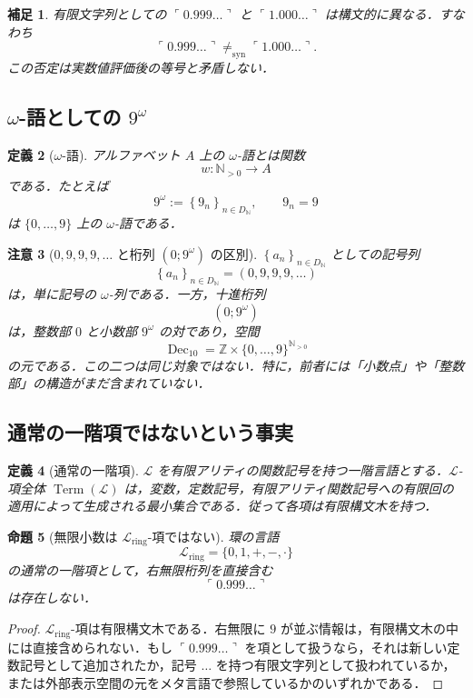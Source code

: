 \documentclass[a4paper,11pt]{ltjsarticle}
\theoremstyle{jpdef}
\newtheorem{definition}{定義}[section]
\newtheorem{remark}[definition]{補足}
\newtheorem{warning}[definition]{注意}
\theoremstyle{jpthm}
\newtheorem{proposition}[definition]{命題}
\newcommand{\N}{\mathbb{N}}
\newcommand{\Z}{\mathbb{Z}}
\newcommand{\Lang}{\mathcal L}
\newcommand{\Term}{\operatorname{Term}}
\newcommand{\Syn}{=_{\mathrm{syn}}}
\newcommand{\Dec}{\operatorname{Dec}_{10}}
\newcommand{\Ns}{\N_{>0}}
\newcommand{\DN}{D_{\N}}
\newcommand{\seq}[2]{\left\{#1\right\}_{#2}}
\begin{document}
\begin{remark}
有限文字列としての \(\ulcorner0.999\ldots\urcorner\) と \(\ulcorner1.000\ldots\urcorner\) は構文的に異なる．すなわち
\[
  \ulcorner0.999\ldots\urcorner\not\Syn\ulcorner1.000\ldots\urcorner .
\]
この否定は実数値評価後の等号と矛盾しない．
\end{remark}

\subsection{\(\omega\)-語としての \(9^\omega\)}

\begin{definition}[\(\omega\)-語]
アルファベット \(A\) 上の \(\omega\)-語とは関数
\[
  w:\Ns\to A
\]
である．たとえば
\[
  9^\omega:=\seq{9_n}{n\in\DN},\qquad 9_n=9
\]
は \(\{0,\ldots,9\}\) 上の \(\omega\)-語である．
\end{definition}

\begin{warning}[\(0,9,9,9,\ldots\) と桁列 \((0;9^\omega)\) の区別]
\(\seq{a_n}{n\in\DN}\) としての記号列
\[
  \seq{a_n}{n\in\DN}=(0,9,9,9,\ldots)
\]
は，単に記号の \(\omega\)-列である．一方，十進桁列
\[
  (0;9^\omega)
\]
は，整数部 \(0\) と小数部 \(9^\omega\) の対であり，空間
\[
  \Dec=\Z\times\{0,\ldots,9\}^{\Ns}
\]
の元である．この二つは同じ対象ではない．特に，前者には「小数点」や「整数部」の構造がまだ含まれていない．
\end{warning}

\subsection{通常の一階項ではないという事実}

\begin{definition}[通常の一階項]
\(\Lang\) を有限アリティの関数記号を持つ一階言語とする．\(\Lang\)-項全体 \(\Term(\Lang)\) は，変数，定数記号，有限アリティ関数記号への有限回の適用によって生成される最小集合である．従って各項は有限構文木を持つ．
\end{definition}

\begin{proposition}[無限小数は \(\Lang_{\mathrm{ring}}\)-項ではない]
環の言語
\[
  \Lang_{\mathrm{ring}}=\{0,1,+,-,\cdot\}
\]
の通常の一階項として，右無限桁列を直接含む
\[
  \ulcorner0.999\ldots\urcorner
\]
は存在しない．
\end{proposition}

\begin{proof}
\(\Lang_{\mathrm{ring}}\)-項は有限構文木である．右無限に \(9\) が並ぶ情報は，有限構文木の中には直接含められない．もし \(\ulcorner0.999\ldots\urcorner\) を項として扱うなら，それは新しい定数記号として追加されたか，記号 \(\ldots\) を持つ有限文字列として扱われているか，または外部表示空間の元をメタ言語で参照しているかのいずれかである．
\end{proof}
\end{document}
